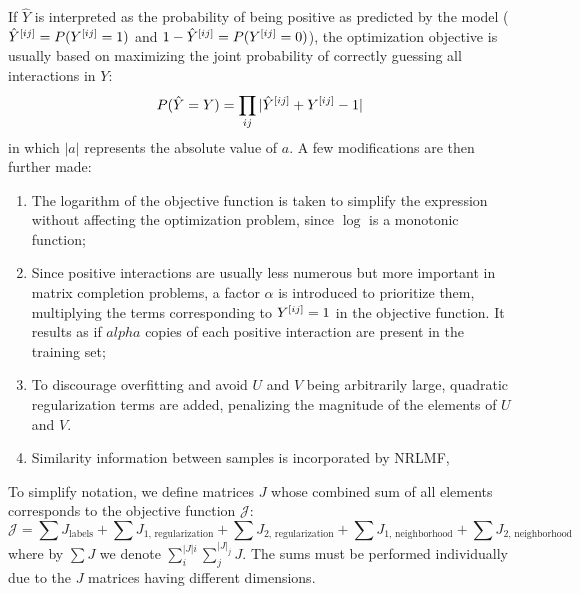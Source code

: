 If $\hat Y$ is interpreted as the probability of being positive as predicted by the model ($\hat Y^{[ij]} = P(Y^{[ij]} = 1)$ and $1-\hat Y^{[ij]} = P(Y^{[ij]} = 0)$),
the optimization objective is usually based on maximizing the joint probability of correctly guessing all interactions in $Y$:
%
\begin{equation}
    P(\hat Y = Y) = \prod_{ij} | \hat Y^{[ij]} + Y^{[ij]} - 1|
    \label{eq:lmf_objective_raw}
\end{equation}
%
in which $|a|$ represents the absolute value of $a$. A few modifications are then further made:
%
\begin{enumerate}
    \item The logarithm of the objective function is taken to simplify the expression without affecting the optimization problem, since $\log$ is a monotonic function;
    \item Since positive interactions are usually less numerous but more important in matrix completion problems, a factor $\alpha$ is introduced to prioritize them, multiplying the terms corresponding to $Y^{[ij]}=1$ in the objective function. It results as if $alpha$ copies of each positive interaction are present in the training set;
    \item To discourage overfitting and avoid $U$ and $V$ being arbitrarily large, quadratic regularization terms are added, penalizing the magnitude of the elements of $U$ and $V$.
    \item Similarity information between samples is incorporated by NRLMF,%
\end{enumerate}
%
To simplify notation, we define matrices $J$ whose combined sum of all elements corresponds to the objective function $\mathcal{J}$:
%
\begin{equation}
    \mathcal{J} =
        \sum J_\text{labels}
        + \sum J_\text{1, regularization}
        + \sum J_\text{2, regularization}
        + \sum J_\text{1, neighborhood}
        + \sum J_\text{2, neighborhood}
    \label{eq:lmf_objective_matrices}
\end{equation}
%
where by $\sum J$ we denote $\sum_i^{|J|i}\sum_j^{|J|_j} J$. The sums must be performed individually due to the $J$ matrices having different dimensions.

